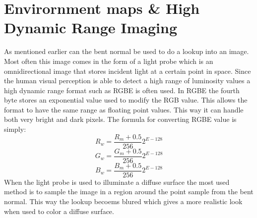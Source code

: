 \section{Envirornment maps \& High Dynamic Range Imaging}
As mentioned earlier can the bent normal be used to do a lookup into an image. Most often this image comes in the form of a light probe which is an omnidirectional image that stores incident light at a certain point in space. Since the human visual perception is able to detect a high range of luminosity values a high dynamic range format such as RGBE is often used. In RGBE the fourth byte stores an exponential value used to modify the RGB value. This allows the format to have the same range as floating point values. This way it can handle both very bright and dark pixels. The formula for converting RGBE value is simply:
\[
R_w = \frac{R_m + 0.5}{256} 2^{E-128} \]\[
G_w = \frac{G_m + 0.5}{256} 2^{E-128} \]\[
B_w = \frac{B_m + 0.5}{256} 2^{E-128} \]\[
\]
When the light probe is used to illuminate a diffuse surface the most used method is to sample the image in a region around the point sample from the bent normal. This way the lookup becoems blured which gives a more realistic look when used to color a diffuse surface.
